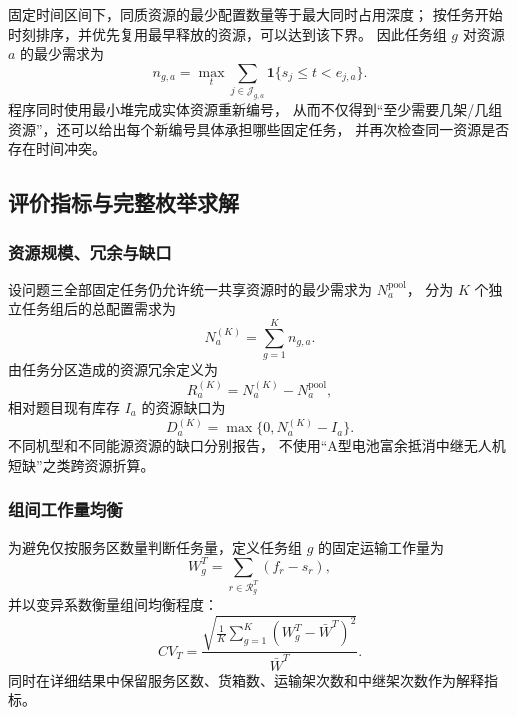 固定时间区间下，同质资源的最少配置数量等于最大同时占用深度；
按任务开始时刻排序，并优先复用最早释放的资源，可以达到该下界\cite{q4-kleinberg2006}。
因此任务组 $g$ 对资源 $a$ 的最少需求为
\begin{equation}
 \boxed{
 n_{g,a}=\max_t\sum_{j\in\mathcal J_{g,a}}
 \mathbf 1\{s_j\le t<e_{j,a}\}
 }.
 \label{eq:q4-resource-depth}
\end{equation}
程序同时使用最小堆完成实体资源重新编号，
从而不仅得到“至少需要几架/几组资源”，还可以给出每个新编号具体承担哪些固定任务，
并再次检查同一资源是否存在时间冲突。

\subsection{评价指标与完整枚举求解}

\subsubsection{资源规模、冗余与缺口}

设问题三全部固定任务仍允许统一共享资源时的最少需求为 $N_a^{\mathrm{pool}}$，
分为 $K$ 个独立任务组后的总配置需求为
\begin{equation}
 N_a^{(K)}=\sum_{g=1}^{K}n_{g,a}.
 \label{eq:q4-total-resource}
\end{equation}
由任务分区造成的资源冗余定义为
\begin{equation}
 R_a^{(K)}=N_a^{(K)}-N_a^{\mathrm{pool}},
 \label{eq:q4-redundancy}
\end{equation}
相对题目现有库存 $I_a$ 的资源缺口为
\begin{equation}
 D_a^{(K)}=\max\{0,N_a^{(K)}-I_a\}.
 \label{eq:q4-shortage}
\end{equation}
不同机型和不同能源资源的缺口分别报告，
不使用“A型电池富余抵消中继无人机短缺”之类跨资源折算。

\subsubsection{组间工作量均衡}

为避免仅按服务区数量判断任务量，定义任务组 $g$ 的固定运输工作量为
\begin{equation}
 W_g^T=\sum_{r\in\mathcal R_g^T}(f_r-s_r),
 \label{eq:q4-workload}
\end{equation}
并以变异系数衡量组间均衡程度：
\begin{equation}
 CV_T=\frac{
 \sqrt{\frac{1}{K}\sum_{g=1}^{K}(W_g^T-\bar W^T)^2}
 }{\bar W^T}.
 \label{eq:q4-cv}
\end{equation}
同时在详细结果中保留服务区数、货箱数、运输架次数和中继架次数作为解释指标。

